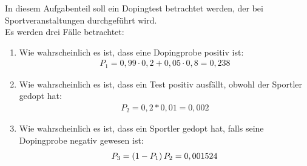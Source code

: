 \documentclass[11pt, ngerman, fleqn, DIV=15, headinclude]{scrartcl}
\begin{document}
\subsubsection{}
In diesem Aufgabenteil soll ein Dopingtest betrachtet werden, der bei Sportveranstaltungen durchgeführt wird.\\
Es werden drei Fälle betrachtet:
\begin{enumerate}
	\item
	Wie wahrscheinlich es ist, dass eine Dopingprobe positiv ist:
	\begin{align*}
		P_1 = 0,99\cdot0,2 + 0,05\cdot0,8 = 0,238
	\end{align*}
	\item
	Wie wahrscheinlich es ist, dass ein Test positiv ausfällt, obwohl der Sportler gedopt hat:
	\begin{align*}
		P_2 = 0,2*0,01 = 0,002
	\end{align*}
	\item
	Wie wahrscheinlich es ist, dass ein Sportler gedopt hat, falls seine Dopingprobe negativ gewesen ist:
	\begin{align*}
		P_3 = \left( 1 - P_1 \right)P_2 = 0,001524
	\end{align*}
\end{enumerate}
\end{document}

